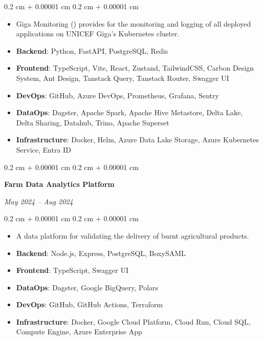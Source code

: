 \documentclass[10pt, a4paper]{article}
\newenvironment{highlights}{
    \begin{itemize}[
        topsep=0.10 cm,
        parsep=0.10 cm,
        partopsep=0pt,
        itemsep=0pt,
        leftmargin=0.4 cm + 10pt
    ]
}{
    \end{itemize}
} %
\newenvironment{onecolentry}{
    \begin{adjustwidth}{
        0.2 cm + 0.00001 cm
    }{
        0.2 cm + 0.00001 cm
    }
}{
    \end{adjustwidth}
} %
\newenvironment{twocolentry}[2][]{
    \onecolentry
    \def\secondColumn{#2}
    \setcolumnwidth{\fill, 4.5 cm}
    \begin{paracol}{2}
}{
    \switchcolumn \raggedleft \secondColumn
    \end{paracol}
    \endonecolentry
} %
\let\hrefWithoutArrow\href
\renewcommand{\href}[2]{\hrefWithoutArrow{#1}{\ifthenelse{\equal{#2}{}}{ }{#2 }\raisebox{.15ex}{\footnotesize \faExternalLink*}}}
\begin{document}
\begin{onecolentry}
\begin{highlights}
                \item Giga Monitoring (\href{https://github.com/unicef/giga-monitoring}{GitHub}) provides for the monitoring and  logging of all deployed applications on UNICEF Giga's Kubernetes cluster.

                \item \textbf{Backend}: Python, FastAPI, PostgreSQL, Redis
                \item \textbf{Frontend}: TypeScript, Vite, React, Zustand, TailwindCSS, Carbon Design System, Ant Design,  Tanstack Query, Tanstack Router, Swagger UI

                \item \textbf{DevOps}: GitHub, Azure DevOps, Prometheus, Grafana, Sentry
                \item \textbf{DataOps}: Dagster, Apache Spark, Apache Hive Metastore, Delta Lake, Delta Sharing, Datahub, Trino,  Apache Superset

                \item \textbf{Infrastructure}: Docker, Helm, Azure Data Lake Storage, Azure Kubernetes Service, Entra ID
            \end{highlights}
        \end{onecolentry}


        \vspace{0.2 cm}

        \begin{twocolentry}{
            
            
        \textit{May 2024 – Aug 2024}}
            \textbf{Farm Data Analytics Platform}
        \end{twocolentry}

        \vspace{0.10 cm}
        \begin{onecolentry}
            \begin{highlights}
                \item A data platform for validating the delivery of burnt agricultural products.
                \item \textbf{Backend}: Node.js, Express, PostgreSQL, BoxySAML
                \item \textbf{Frontend}: TypeScript, Swagger UI
                \item \textbf{DataOps}: Dagster, Google BigQuery, Polars
                \item \textbf{DevOps}: GitHub, GitHub Actions, Terraform
                \item \textbf{Infrastructure}: Docker, Google Cloud Platform, Cloud Run, Cloud SQL, Compute Engine, Azure Enterprise App
            \end{highlights}
        \end{onecolentry}
\end{document}
